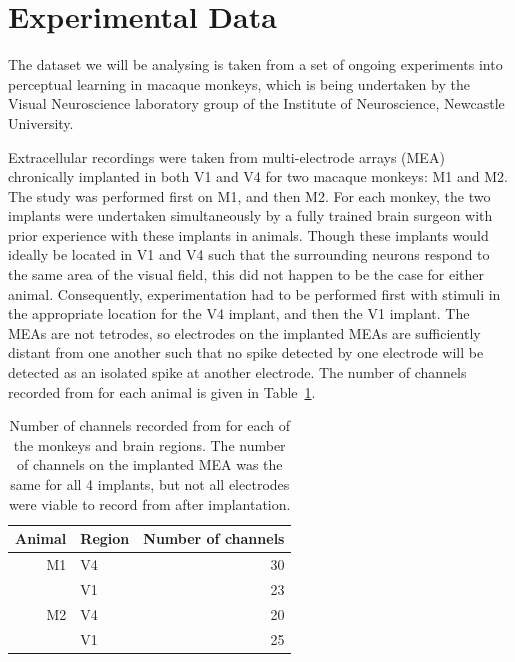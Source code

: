 \section{Experimental Data}
\label{ch:exp}

The dataset we will be analysing is taken from a set of ongoing experiments into perceptual learning in macaque monkeys, which is being undertaken by the Visual Neuroscience laboratory group of the Institute of Neuroscience, Newcastle University.

Extracellular recordings were taken from multi-electrode arrays (MEA) chronically implanted in both V1 and V4 for two macaque monkeys: M1 and M2. The study was performed first on M1, and then M2. For each monkey, the two implants were undertaken simultaneously by a fully trained brain surgeon with prior experience with these implants in animals. Though these implants would ideally be located in V1 and V4 such that the surrounding neurons respond to the same area of the visual field, this did not happen to be the case for either animal. Consequently, experimentation had to be performed first with stimuli in the appropriate location for the V4 implant, and then the V1 implant.
The MEAs are not tetrodes, so electrodes on the implanted MEAs are sufficiently distant from one another such that no spike detected by one electrode will be detected as an isolated spike at another electrode. The number of channels recorded from for each animal is given in Table~\ref{tab:nchannels}.

\begin{table}[hbtp]
\caption{Number of channels recorded from for each of the monkeys and brain regions. The number of channels on the implanted MEA was the same for all 4 implants, but not all electrodes were viable to record from after implantation.}
\label{tab:nchannels}
\begin{center}
\begin{tabular}{rlr}
\toprule
Animal  & Region & Number of channels
\\
\midrule
M1  & V4    & 30
\\
        & V1    & 23
\\
M2    & V4    & 20
\\
        & V1    & 25
\\
\bottomrule
\end{tabular}
\end{center}
\end{table}

